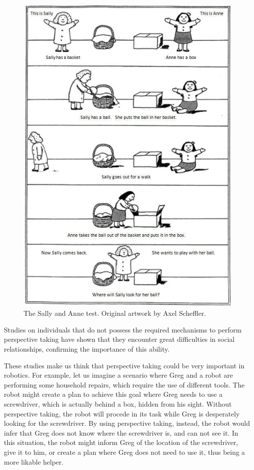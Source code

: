  \begin{figure}[ht!]
	\centering
	\includegraphics[scale=0.45]{img/observer/sally-anne.jpg}
	\caption{The Sally and Anne test. Original artwork by Axel Scheffler.}
	\label{fig:belief_management-sally_anne}
\end{figure}

Studies on individuals that do not possess the required mechanisms to perform perspective taking \citep{frick2014picturing} have shown that they encounter great difficulties in social relationships, confirming the importance of this ability.

These studies make us think that perspective taking could be very important in robotics. For example, let us imagine a scenario where Greg and a robot are performing some household repairs, which require the use of different tools. The robot might create a plan to achieve this goal where Greg needs to use a screwdriver, which is actually behind a box, hidden from his sight. Without perspective taking, the robot will procede in its task while Greg is desperately looking for the screwdriver. By using perspective taking, instead, the robot would infer that Greg does not know where the screwdriver is, and can not see it. In this situation, the robot might inform Greg of the location of the screwdriver, give it to him, or create a plan where Greg does not need to use it, thus being a more likable helper.

